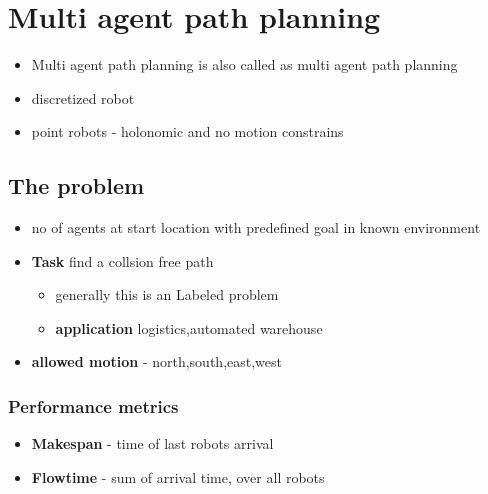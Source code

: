 \documentclass[a4paper]{article}
\begin{document}
   \section{Multi agent path planning}
   \begin{itemize}
       \item Multi agent path planning is also called as multi agent path planning
       \item discretized robot
       \item point robots - holonomic and no motion constrains
   \end{itemize}
   \subsection{The problem}
   \begin{itemize}
       \item no of agents at start location with predefined goal in known environment
       \item \textbf{Task} find a collsion free path
   \begin{itemize}
       \item generally this is an Labeled problem
       \item \textbf{application} logistics,automated warehouse
   \end{itemize}
        \item \textbf{allowed motion} - north,south,east,west
    \end{itemize}
    \subsubsection{Performance metrics}
    \begin{itemize}
        \item \textbf{Makespan} - time of last robots arrival 
        \item \textbf{Flowtime} - sum of arrival time, over all robots
    \end{itemize}
\end{document}
